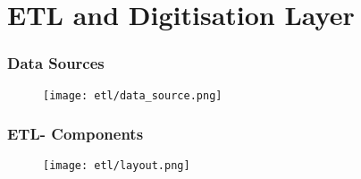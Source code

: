 \section{ETL and Digitisation Layer}

\begin{frame}
    \frametitle{Data Sources}
    \begin{figure}
        \centering
        \texttt{[image: etl/data\_source.png]} %
        
    \end{figure}
\end{frame}
\begin{frame}
    \frametitle{ETL- Components}
    \begin{figure}
        \centering
        \texttt{[image: etl/layout.png]} %
       
    \end{figure}
\end{frame}

       




